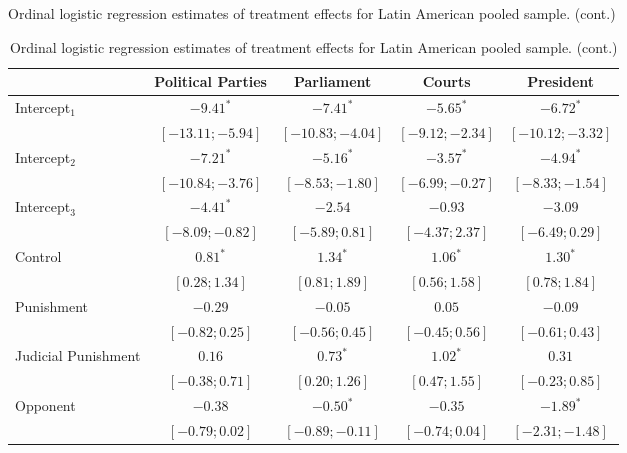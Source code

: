 \begin{table}[h]
\begin{center}
\caption
*
{Ordinal logistic regression estimates of treatment effects for Latin American pooled sample. (cont.)}
\caption{Ordinal logistic regression estimates of treatment effects for Latin American pooled sample. (cont.)}
\begin{threeparttable}
\begin{tabular}{l c c c c}
\hline
 & Political Parties & Parliament & Courts & President \\
\hline
Intercept$_1$            & $-9.41^{*}$        & $-7.41^{*}$        & $-5.65^{*}$       & $-6.72^{*}$        \\
                         & $ [-13.11; -5.94]$ & $ [-10.83; -4.04]$ & $ [-9.12; -2.34]$ & $ [-10.12; -3.32]$ \\
Intercept$_2$            & $-7.21^{*}$        & $-5.16^{*}$        & $-3.57^{*}$       & $-4.94^{*}$        \\
                         & $ [-10.84; -3.76]$ & $ [ -8.53; -1.80]$ & $ [-6.99; -0.27]$ & $ [ -8.33; -1.54]$ \\
Intercept$_3$            & $-4.41^{*}$        & $-2.54$            & $-0.93$           & $-3.09$            \\
                         & $ [ -8.09; -0.82]$ & $ [ -5.89;  0.81]$ & $ [-4.37;  2.37]$ & $ [ -6.49;  0.29]$ \\
Control                  & $0.81^{*}$         & $1.34^{*}$         & $1.06^{*}$        & $1.30^{*}$         \\
                         & $ [  0.28;  1.34]$ & $ [  0.81;  1.89]$ & $ [ 0.56;  1.58]$ & $ [  0.78;  1.84]$ \\
Punishment               & $-0.29$            & $-0.05$            & $0.05$            & $-0.09$            \\
                         & $ [ -0.82;  0.25]$ & $ [ -0.56;  0.45]$ & $ [-0.45;  0.56]$ & $ [ -0.61;  0.43]$ \\
Judicial Punishment      & $0.16$             & $0.73^{*}$         & $1.02^{*}$        & $0.31$             \\
                         & $ [ -0.38;  0.71]$ & $ [  0.20;  1.26]$ & $ [ 0.47;  1.55]$ & $ [ -0.23;  0.85]$ \\
Opponent                 & $-0.38$            & $-0.50^{*}$        & $-0.35$           & $-1.89^{*}$        \\
                         & $ [ -0.79;  0.02]$ & $ [ -0.89; -0.11]$ & $ [-0.74;  0.04]$ & $ [ -2.31; -1.48]$ \\

\end{tabular}
\end{threeparttable}
\end{center}
\end{table}
